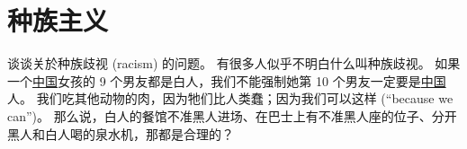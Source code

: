 \documentclass[12pt]{report}
\begin{document}
{%



\chapter{种族主义}

谈谈关於种族歧视 (racism) 的问题。 有很多人似乎不明白什么叫种族歧视。 如果一个\uline{中国}女孩的 9 个男友都是白人，我们不能强制她第 10 个男友一定要是\uline{中国}人。 我们吃其他动物的肉，因为牠们比人类蠢；因为我们可以这样 (``because we can'')。 那么说，白人的餐馆不准黑人进场、在巴士上有不准黑人座的位子、分开黑人和白人喝的泉水机，那都是合理的？

}
\end{document}
